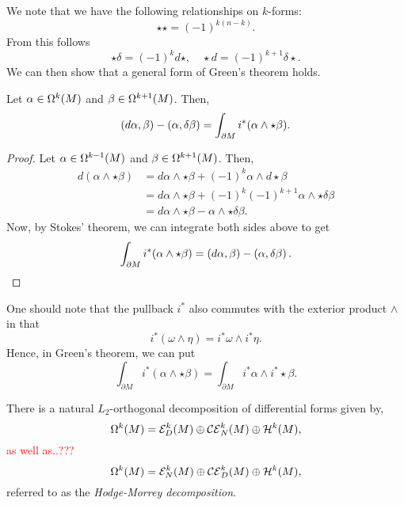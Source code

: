 \documentclass[12pt]{article}
\begin{document}
We note that we have the following relationships on $k$-forms:
\[
\star \star = (-1)^{k(n-k)}. 
\]
From this follows
\[
 \star \delta = (-1)^{k}d\star, \quad \star d = (-1)^{k+1} \delta \star.
\]
We can then show that a general form of Green's theorem holds.
\begin{theorem}
Let $\alpha \in \kforms{k}{}$ and $\beta \in \kforms{k+1}{}$. Then,
\[
\kforminnprod{d\alpha}{\beta} - \kforminnprod{\alpha}{\delta \beta} = \int_{\partial M} i^* (\alpha \wedge \star \beta).
\]
\end{theorem}
\begin{proof}
Let $\alpha \in \kforms{k-1}{}$ and $\beta \in \kforms{k+1}{}$. Then,
\begin{align*}
d(\alpha \wedge \star \beta) &= d\alpha \wedge \star \beta + (-1)^{k} \alpha \wedge d\star \beta\\
&= d\alpha \wedge \star \beta + (-1)^{k}(-1)^{k+1} \alpha \wedge \star \delta \beta\\
&= d\alpha \wedge \star \beta - \alpha \wedge \star \delta \beta.
\end{align*}
Now, by Stokes' theorem, we can integrate both sides above to get
\[
\int_{\partial M} i^* (\alpha \wedge \star \beta) = \kforminnprod{d\alpha}{\beta} - \kforminnprod{\alpha}{\delta \beta}.
\]
\end{proof}
One should note that the pullback $i^*$ also commutes with the exterior product $\wedge$ in that
\[
i^*(\omega \wedge \eta) = i^*\omega \wedge i^* \eta.
\]
Hence, in Green's theorem, we can put
\[
\int_{\partial M} i^*(\alpha \wedge \star \beta) = \int_{\partial M} i^*\alpha \wedge i^* \star \beta.
\]

There is a natural $L_2$-orthogonal decomposition of differential forms given by,
\[
\kforms{k}{} = \exact{k}{D} \oplus \coexact{k}{N} \oplus \harmonic{k}{},
\]
\textcolor{red}{as well as..???
\[
\kforms{k}{} = \exact{k}{N} \oplus \coexact{k}{D} \oplus \harmonic{k}{},
\]
}referred to as the \emph{Hodge-Morrey decomposition}. 
\end{document}
